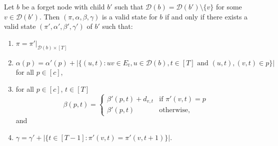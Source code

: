 \documentclass[runningheads]{llncs}
\begin{document}
\begin{lemma} \label{lem:tw forget}
    Let $b$ be a forget node with child $b'$ such that $\mathcal{D}(b)=\mathcal{D}(b')\setminus\{v\}$ for some $v \in \mathcal{D}(b')$. Then $(\pi,\alpha,\beta,\gamma)$ is a valid state for $b$ if and only if there exists a valid state $(\pi',\alpha',\beta',\gamma')$ of $b'$ such that:
    \begin{enumerate}
    \item $\pi=\pi'| _{\mathcal{D}(b)\times [T]}$ 
    \item $\alpha(p) =\alpha'(p) +|\{(u,t):uv \in E_t,u\in \mathcal{D}(b), t\in[T] \text{ and } (u,t),(v,t) \in p\}|$ for all $p\in[c]$,
    \item for all $p\in[c]$, $t\in[T]$ 
    $$\beta(p,t)=
    \begin{cases}
        \beta'(p,t) + d_{v,t} & \text{if } \pi'(v,t)=p\\
        \beta'(p,t) & \text{otherwise,}
    \end{cases}$$ and 
    \item $\gamma = \gamma' + |\{t \in [T-1]:\pi'(v,t)=\pi'(v,t+1)\}|$.
    \end{enumerate}
\end{lemma}
\end{document}
